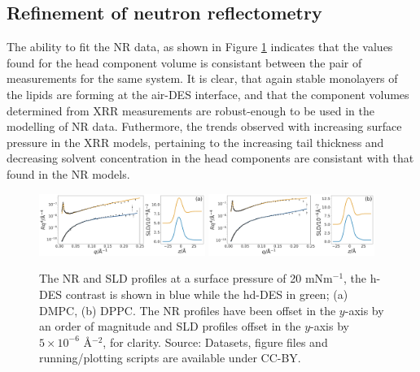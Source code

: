 \documentclass[twoside,twocolumn,9pt]{article}
\begin{document}
\subsection{Refinement of neutron reflectometry}
The ability to fit the NR data, as shown in Figure \ref{fig:neutron} indicates that the values found for the head component volume is consistant between the pair of measurements for the same system. It is clear, that again stable monolayers of the lipids are forming at the air-DES interface, and that the component volumes determined from XRR measurements are robust-enough to be used in the modelling of NR data. Futhermore, the trends observed with increasing surface pressure in the XRR models, pertaining to the increasing tail thickness and decreasing solvent concentration in the head components are consistant with that found in the NR models.
%
\begin{figure}
	\centering
	\includegraphics[width=0.48\textwidth]{figures/nDMPC20_all_data}
	\includegraphics[width=0.48\textwidth]{figures/nDPPC20_all_data}
	\caption{The NR and SLD profiles at a surface pressure of 20 mNm$^{-1}$, the h-DES contrast is shown in blue while the hd-DES in green; (a) DMPC, (b) DPPC. The NR profiles have been offset in the $y$-axis by an order of magnitude and SLD profiles offset in the $y$-axis by $5\times10^{-6}$ \AA$^{-2}$, for clarity. Source: Datasets, figure files and running/plotting scripts are available under CC-BY.\cite{mccluskey_2018}}
	\label{fig:neutron}
\end{figure}
%
\end{document}
